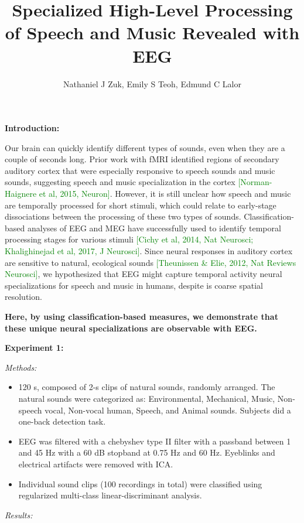\documentclass[11pt]{article}
\title{Specialized High-Level Processing of Speech and Music Revealed with EEG}
\author{Nathaniel J Zuk, Emily S Teoh, Edmund C Lalor}
\begin{document}
\maketitle

\textbf{Introduction:}

Our brain can quickly identify different types of sounds, even when they are a couple of seconds long.  Prior work with fMRI identified regions of secondary auditory cortex that were especially responsive to speech sounds and music sounds, suggesting speech and music specialization in the cortex \textcolor{green}{[Norman-Haignere et al, 2015, Neuron]}. However, it is still unclear how speech and music are temporally processed for short stimuli, which could relate to early-stage dissociations between the processing of these two types of sounds. Classification-based analyses of EEG and MEG have successfully used to identify temporal processing stages for various stimuli \textcolor{green}{[Cichy et al, 2014, Nat Neurosci; Khalighinejad et al, 2017, J Neurosci]}.  Since neural responses in auditory cortex are sensitive to natural, ecological sounds \textcolor{green}{[Theunissen \& Elie, 2012, Nat Reviews Neurosci]}, we hypothesized that EEG might capture temporal activity neural specializations for speech and music in humans, despite is coarse spatial resolution.

\textbf{Here, by using classification-based measures, we demonstrate that these unique neural specializations are observable with EEG.}

\textbf{Experiment 1:}

\textit{Methods:} 

\begin{itemize}
\item 120 s, composed of 2-s clips of natural sounds, randomly arranged.  The natural sounds were categorized as: Environmental, Mechanical, Music, Non-speech vocal, Non-vocal human, Speech, and Animal sounds.  Subjects did a one-back detection task.
\item EEG was filtered with a chebyshev type II filter with a passband between 1 and 45 Hz with a 60 dB stopband at 0.75 Hz and 60 Hz.  Eyeblinks and electrical artifacts were removed with ICA.
\item Individual sound clips (100 recordings in total) were classified using regularized multi-class linear-discriminant analysis.  
\end{itemize}

\textit{Results:}
\end{document}
